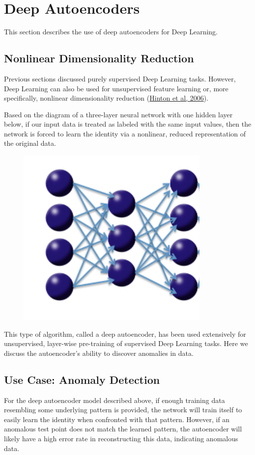 {{\newpage
\section{Deep Autoencoders}
\label{sec:DeepAutoencoders}  
This section describes the use of deep autoencoders for Deep Learning. 
\subsection{Nonlinear Dimensionality Reduction} 
Previous sections discussed purely supervised Deep Learning tasks. However, Deep Learning can also be used for unsupervised feature learning or, more specifically, nonlinear dimensionality reduction  (\href{http://www.cs.toronto.edu/~hinton/science.pdf}{Hinton et al, 2006}). 

Based on the diagram of a three-layer neural network with one hidden layer below, if our input data is treated as labeled with the same input values, then the network is forced to learn the identity via a nonlinear, reduced representation of the original data. 

\begin{figure}[h!]
\centering
\includegraphics[scale=0.5]{autoencoder.png}
\end{figure}

This type of algorithm, called a deep autoencoder, has been used extensively for unsupervised, layer-wise pre-training of supervised Deep Learning tasks. Here we discuss the autoencoder's ability to discover anomalies in data. 



\subsection{Use Case: Anomaly Detection} %
For the deep autoencoder model described above, if enough training data resembling some underlying pattern is provided, the network will train itself to easily learn the identity when confronted with that pattern. However, if an anomalous test point does not match the learned pattern, the autoencoder will likely have a high error rate in reconstructing this data, indicating anomalous data.

}}
